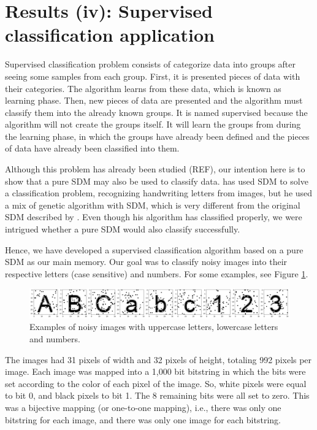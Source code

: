 
\section{Results (iv): Supervised classification application}

Supervised classification problem consists of categorize data into groups after seeing some samples from each group. First, it is presented pieces of data with their categories. The algorithm learns from these data, which is known as learning phase. Then, new pieces of data are presented and the algorithm must classify them into the already known groups. It is named supervised because  the algorithm will not create the groups itself. It will learn the groups from during the learning phase, in which the groups have already been defined and the pieces of data have already been classified into them.

Although this problem has already been studied (REF), our intention here is to show that a pure SDM may also be used to classify data. \citet{fan1997genetic} has used SDM to solve a classification problem, recognizing handwriting letters from images, but he used a mix of genetic algorithm with SDM, which is very different from the original SDM described by \cite{Kanerva1988}. Even though his algorithm has classified properly, we were intrigued whether a pure SDM would also classify successfully.

Hence, we have developed a supervised classification algorithm based on a pure SDM as our main memory. Our goal was to classify noisy images into their respective letters (case sensitive) and numbers. For some examples, see Figure \ref{fig-classification-examples}.

\begin{figure}[!htb]
\centering\includegraphics[width=\textwidth]{./images02/classification/example.png}
\caption{Examples of noisy images with uppercase letters, lowercase letters and numbers.
\label{fig-classification-examples}}
\end{figure}

The images had 31 pixels of width and 32 pixels of height, totaling 992 pixels per image. Each image was mapped into a 1,000 bit bitstring in which the bits were set according to the color of each pixel of the image. So, white pixels were equal to bit 0, and black pixels to bit 1. The 8 remaining bits were all set to zero. This was a bijective mapping (or one-to-one mapping), i.e., there was only one bitstring for each image, and there was only one image for each bitstring.

